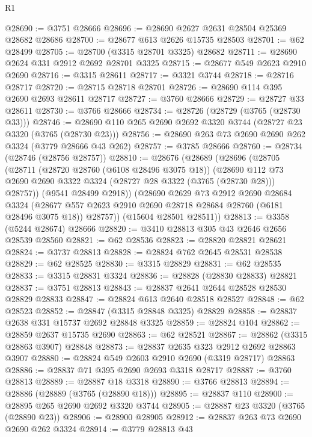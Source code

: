 \begin{lexlean}{R1}
\begin{coremodule}
@28690 := @3751 @28666
@28696 := @28690 @2627 @2631 @28504 @25369 @28682 @28686
@28700 := @28677 @613 @2626 @15735 @28503
@28701 := @62 @28499
@28705 := @28700 (@3315 @28701 @3325) @28682
@28711 := @28690 @2624 @331 @2912 @2692 @28701 @3325
@28715 := @28677 @549 @2623 @2910 @2690
@28716 := @3315 @28611
@28717 := @3321 @3744
@28718 := @28716 @28717
@28720 := @28715 @28718 @28701
@28726 := @28690 @114 @395 @2690 @2693 @28611 @28717
@28727 := @3760 @28666
@28729 := @28727 @33 @28611
@28730 := @3766 @28666
@28734 := @28726 (@28729 (@3765 (@28730 @33)))
@28746 := @28690 @110 @265 @2690 @2692 @3320 @3744 (@28727 @23 @3320 (@3765 (@28730 @23)))
@28756 := @28690 @263 @73 @2690 @2690 @262 @3324 (@3779 @28666 @43 @262)
@28757 := @3785 @28666
@28760 := @28734 (@28746 (@28756 @28757))
@28810 := @28676
    (@28689
      (@28696
        (@28705
          (@28711
            (@28720 @28760 (@6108 @28496 @3075 @18))
            (@28690
              @112
              @73
              @2690
              @2690
              @3322
              @3324
              (@28727 @28 @3322 (@3765 (@28730 @28)))
              @28757))
          (@9541 @28499 @2918))
        (@28690
          @2629
          @73
          @2912
          @2690
          @28684
          @3324
          (@28677 @557 @2623 @2910 @2690 @28718 @28684 @28760 (@6181 @28496 @3075 @18))
          @28757))
      (@15604 @28501 @28511))
@28813 := @3358 (@5244 @28674) @28666
@28820 := @3410 @28813 @305 @43 @2646 @2656 @28539 @28560
@28821 := @62 @28536
@28823 := @28820 @28821 @28621
@28824 := @3737 @28813
@28828 := @28824 @762 @2645 @28531 @28538
@28829 := @62 @28525
@28830 := @3315 @28829
@28831 := @62 @28535
@28833 := @3315 @28831 @3324
@28836 := @28828 (@28830 @28833) @28821
@28837 := @3751 @28813
@28843 := @28837 @2641 @2644 @28528 @28530 @28829 @28833
@28847 := @28824 @613 @2640 @28518 @28527
@28848 := @62 @28523
@28852 := @28847 (@3315 @28848 @3325) @28829
@28858 := @28837 @2638 @331 @15737 @2692 @28848 @3325
@28859 := @28824 @104
@28862 := @28859 @2637 @15735 @2690
@28863 := @62 @28521
@28867 := @28862 (@3315 @28863 @3907) @28848
@28873 := @28837 @2635 @323 @2912 @2692 @28863 @3907
@28880 := @28824 @549 @2603 @2910 @2690 (@3319 @28717) @28863
@28886 := @28837 @71 @395 @2690 @2693 @3318 @28717
@28887 := @3760 @28813
@28889 := @28887 @18 @3318
@28890 := @3766 @28813
@28894 := @28886 (@28889 (@3765 (@28890 @18)))
@28895 := @28837 @110
@28900 := @28895 @265 @2690 @2692 @3320 @3744
@28905 := @28887 @23 @3320 (@3765 (@28890 @23))
@28906 := @28900 @28905
@28912 := @28837 @263 @73 @2690 @2690 @262 @3324
@28914 := @3779 @28813 @43

\end{coremodule}
\end{lexlean}
